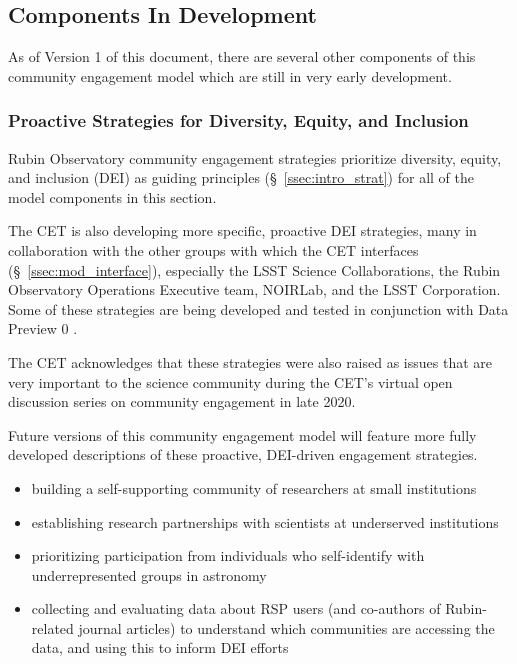 \documentclass[DM,lsstdraft,toc]{lsstdoc}
\begin{document}
\subsection{Components In Development}\label{ssec:mod_dev}

As of Version 1 of this document, there are several other components of this community engagement model which are still in very early development.


\subsubsection{Proactive Strategies for Diversity, Equity, and Inclusion}\label{sssec:mod_dev_proact}

Rubin Observatory community engagement strategies prioritize diversity, equity, and inclusion (DEI) as guiding principles (\S~\ref{ssec:intro_strat}) for all of the model components in this section.

The CET is also developing more specific, proactive DEI strategies, many in collaboration with the other groups with which the CET interfaces (\S~\ref{ssec:mod_interface}), especially the LSST Science Collaborations, the Rubin Observatory Operations Executive team, NOIRLab, and the LSST Corporation.
Some of these strategies are being developed and tested in conjunction with Data Preview 0 .

The CET acknowledges that these strategies were also raised as issues that are very important to the science community during the CET's virtual open discussion series on community engagement in late 2020.

Future versions of this community engagement model will feature more fully developed descriptions of these proactive, DEI-driven engagement strategies.

\begin{itemize}
\item building a self-supporting community of researchers at small institutions
\item establishing research partnerships with scientists at underserved institutions
\item prioritizing participation from individuals who self-identify with underrepresented groups in astronomy
\item collecting and evaluating data about RSP users (and co-authors of Rubin-related journal articles) to understand which communities are accessing the data, and using this to inform DEI efforts
\end{itemize}
\end{document}

